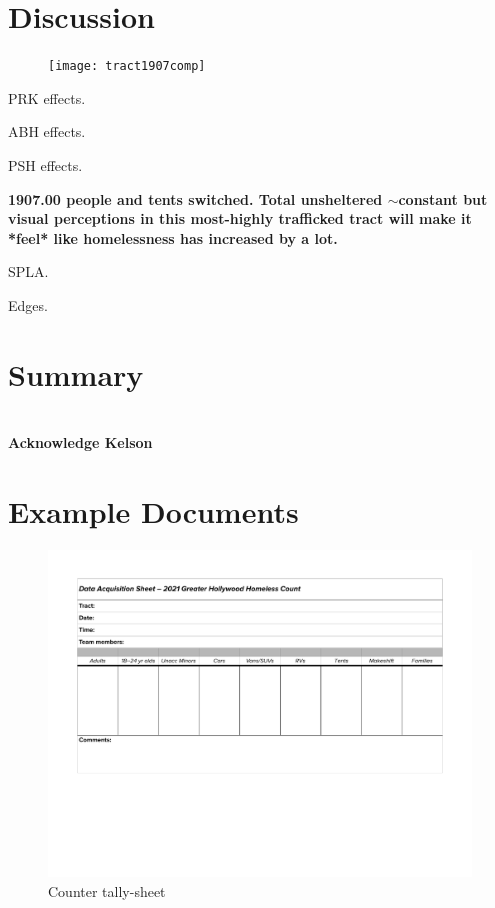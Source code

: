 \documentclass[11pt,twocolumn]{article}
\def\bfr{\bf\color{red}}
\begin{document}
\section{Discussion}
\label{sec:discussion}

\begin{figure}[]
	\centering
	\texttt{[image: tract1907comp]}
	\caption{}
\end{figure}

PRK effects.

ABH effects.

PSH effects.

{\bfr 1907.00 people and tents switched. Total unsheltered $\sim$constant but visual perceptions
in this most-highly trafficked tract will make it *feel* like homelessness has increased by a lot.}

SPLA.

Edges.

\section{Summary}
\label{sec:summary}

\section*{}

{\bfr Acknowledge Kelson}

\appendix

\section{Example Documents}

\begin{figure}
	\centering
	\includegraphics[width =\linewidth]{Hollywood2021CountDataSheet}
	\caption{Counter tally-sheet}
\end{figure}
\end{document}
